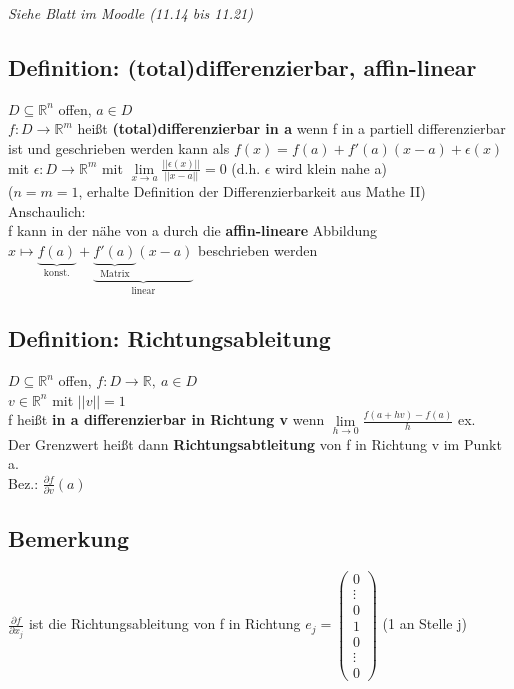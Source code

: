 \hspace*{0.5cm}
\hspace*{1cm}
\emph{Siehe Blatt im Moodle (11.14 bis 11.21)}

\setcounter{subsection}{21}
\subsection{Definition: (total)differenzierbar, affin-linear}
$D\subseteq \mathbb{R}^n$ offen, $a\in D$\\
$f:D\rightarrow \mathbb{R}^m$ heißt \textbf{(total)differenzierbar in a} wenn f in a partiell differenzierbar ist und geschrieben werden kann als $f(x)=f(a)+f'(a)(x-a)+\epsilon(x)$ mit $\epsilon: D\rightarrow \mathbb{R}^m$ mit $\lim\limits_{x\rightarrow a} \frac{||\epsilon(x)||}{||x-a||}=0$ (d.h. $\epsilon$ wird klein nahe a)\\
($n=m=1$, erhalte Definition der Differenzierbarkeit aus Mathe II)\\
Anschaulich:\\
f kann in der nähe von a durch die \textbf{affin-lineare} Abbildung $x\mapsto \underbrace{f(a)}_{\text{konst.}}+\underbrace{\underbrace{f'(a)}_{\text{Matrix}}(x-a)}_{\text{linear}}$ beschrieben werden

\subsection{Definition: Richtungsableitung}
$D\subseteq \mathbb{R}^n$ offen, $f:D\rightarrow \mathbb{R}, \ a\in D$\\
$v\in \mathbb{R}^n$ mit $||v||=1$\\
f heißt \textbf{in a differenzierbar in Richtung v} wenn $\lim\limits_{h\rightarrow 0} \frac{f(a+hv)-f(a)}{h}$ ex.\\
Der Grenzwert heißt dann \textbf{Richtungsabtleitung} von f in Richtung v im Punkt a.\\
Bez.: $\frac{\partial f}{\partial v}(a)$

\subsection{Bemerkung}
$\frac{\partial f}{\partial x_j}$ ist die Richtungsableitung von f in Richtung $e_j=\begin{pmatrix}0 \\ \vdots \\ 0 \\ 1 \\ 0 \\ \vdots \\ 0\end{pmatrix}$ (1 an Stelle j)

